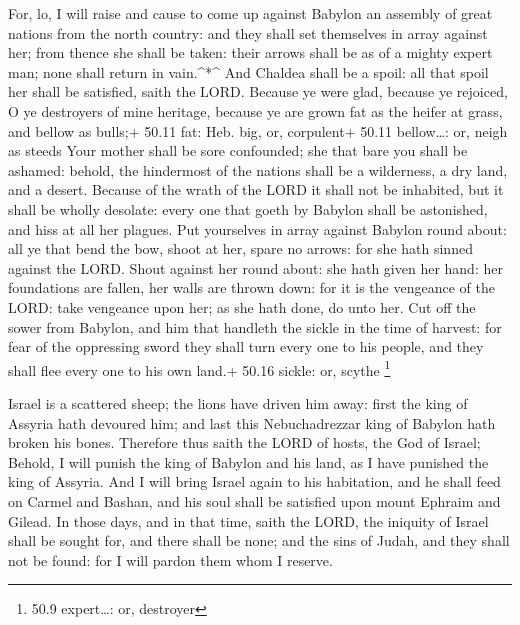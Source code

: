  For, lo, I will raise and cause to come up against Babylon
an assembly of great nations from the north country: and they shall set
themselves in array against her; from thence she shall be taken: their
arrows shall be as of a mighty expert man; none shall return in
vain.\^{}*\^{}  And Chaldea shall be a spoil: all that
spoil her shall be satisfied, saith the LORD.  Because ye
were glad, because ye rejoiced, O ye destroyers of mine heritage,
because ye are grown fat as the heifer at grass, and bellow as bulls;+
50.11 fat: Heb. big, or, corpulent+ 50.11 bellow\ldots: or, neigh as
steeds  Your mother shall be sore confounded; she that bare
you shall be ashamed: behold, the hindermost of the nations shall be a
wilderness, a dry land, and a desert.  Because of the wrath
of the LORD it shall not be inhabited, but it shall be wholly desolate:
every one that goeth by Babylon shall be astonished, and hiss at all her
plagues.  Put yourselves in array against Babylon round
about: all ye that bend the bow, shoot at her, spare no arrows: for she
hath sinned against the LORD.  Shout against her round
about: she hath given her hand: her foundations are fallen, her walls
are thrown down: for it is the vengeance of the LORD: take vengeance
upon her; as she hath done, do unto her.  Cut off the sower
from Babylon, and him that handleth the sickle in the time of harvest:
for fear of the oppressing sword they shall turn every one to his
people, and they shall flee every one to his own land.+ 50.16 sickle:
or, scythe \footnote{50.9 expert\ldots: or, destroyer}

 Israel is a scattered sheep; the lions have driven him
away: first the king of Assyria hath devoured him; and last this
Nebuchadrezzar king of Babylon hath broken his bones. 
Therefore thus saith the LORD of hosts, the God of Israel; Behold, I
will punish the king of Babylon and his land, as I have punished the
king of Assyria.  And I will bring Israel again to his
habitation, and he shall feed on Carmel and Bashan, and his soul shall
be satisfied upon mount Ephraim and Gilead.  In those days,
and in that time, saith the LORD, the iniquity of Israel shall be sought
for, and there shall be none; and the sins of Judah, and they shall not
be found: for I will pardon them whom I reserve.


